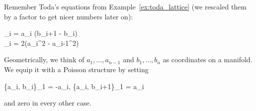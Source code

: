 \documentclass[main.tex]{subfiles}
\begin{document}
\begin{example}
	Remember Toda's equations from Example~\ref{ex:toda_lattice} (we rescaled them by a factor to get nicer numbers later on):
	\begin{eqalign}
		\begin{cases}
			_i = a_i (b_{i+1} - b_i)\\
			_i = 2(a_i^2 - a_{i-1}^2)
		\end{cases}
	\end{eqalign}
	Geometrically, we think of $a_1, \ldots, a_{n-1}$ and $b_1, \ldots, b_n$ as coordinates on a manifold. We equip it with a Poisson structure by setting
	\begin{eqalign}
		\{a_i, b_i\}_1 = -a_i, \quad \{a_i, b_{i+1}\}_1 = a_i
	\end{eqalign}
	and zero in every other case.


\end{example}
\end{document}
